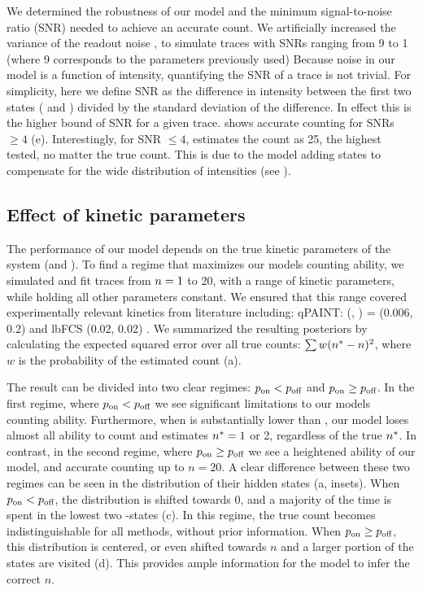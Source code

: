 We determined the robustness of our model and the minimum signal-to-noise ratio 
(SNR) needed to achieve an accurate count.
	We artificially increased the variance of the readout noise \camvar, 
	to simulate traces with SNRs ranging from 9 to 1 (where 9 
	corresponds to the parameters previously used)
	Because noise in our model is a function of intensity, quantifying the SNR of a trace 
	is not trivial. 
	For simplicity, here we define SNR as the difference in intensity between 
	the first two states ( and ) divided by the standard deviation of the difference. 
	In effect this is the higher bound of SNR for a given trace. 
	\ours shows accurate counting for SNRs $\geq 4$ (e). 
	Interestingly, for  SNR $\leq 4$, \ours estimates the count as 25, 
	the highest \n tested, no matter the true count. 
	This is due to the model adding states to compensate for the wide distribution of intensities  
	(see ).

\subsection{Effect of kinetic parameters}
The performance of our model depends on the true kinetic parameters of the system (\pon and \poff).
%
	To find a regime that maximizes our models counting ability, we simulated and fit traces 
	from $n=1$ to 20, with a range of kinetic parameters, 
	while holding all other parameters constant.
	We ensured that this range covered experimentally relevant kinetics from literature including:
	qPAINT: (\pon, \poff) = (0.006, 0.2) \cite{jungmann_2016} and lbFCS (0.02, 0.02) \cite{stein_2021}. 
	We summarized the resulting posteriors by calculating the expected squared error over all true counts: 
	$\sum w(n^* - n)^2$, where $w$ is the probability of the estimated count \n 
	(a).

The result can be divided into two clear regimes: $p_\text{on} < p_\text{off}$ and $p_\text{on} \geq p_\text{off}$.
	In the first regime, where $p_\text{on} < p_\text{off}$ we see significant limitations to our models counting ability.
	Furthermore, when \pon is substantially lower than \poff, our model loses almost 
	all ability to count and estimates $n^*=1$ or 2, regardless of the true $n^*$.
	In contrast, in the second regime, where $p_\text{on} \geq p_\text{off}$ we see a heightened ability of our model, 
	and accurate counting up to $n=20$.
	A clear difference between these two regimes can be seen in the distribution 
	of their hidden states \z{} (a, insets).
	When $p_\text{on} < p_\text{off}$, the distribution is shifted towards 0, and a majority 
	of the time is spent in the lowest two \z{}-states (c). 
	In this regime, the true count becomes indistinguishable for all methods, without prior information. 
	When $p_\text{on} \geq p_\text{off}$, this distribution is centered, or even shifted towards $n$ 
	and a larger portion of the states are visited (d). 
	This provides ample information for the model to infer the correct $n$.
	
